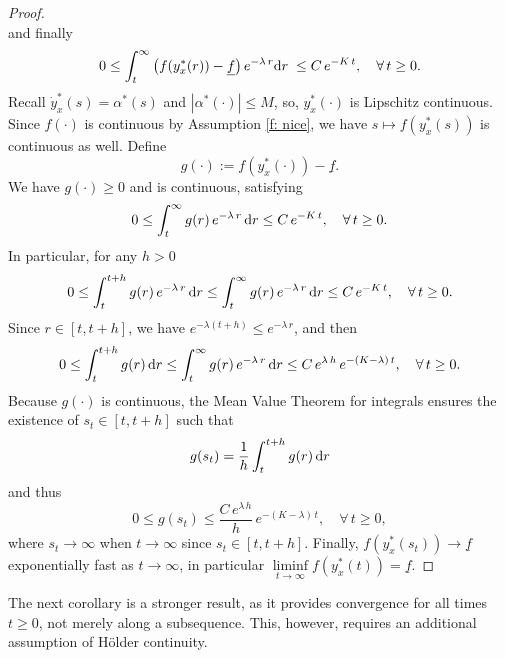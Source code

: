 \documentclass[12pt]{amsart}
\newcommand{\D}[1]{\mbox{\rm #1}}
\newcommand{\dd}{\D{d}}
\numberwithin{equation}{section}
\theoremstyle{plain}
\begin{document}
\begin{proof}
\begin{equation}
\end{equation}
and finally 
\begin{equation*}
    0\leq \int_{t}^{\infty}\left( f(y_{x}^{*}(r)) - \underline{f}\right) e^{-\lambda \, r }\dd r \; \leq C\, e^{-K\,t}, \quad \forall\,t\geq 0.
\end{equation*}
Recall $\dot{y}_{x}^{*}(s) = \alpha^{*}(s)$ and $|\alpha^{*}(\cdot)|\leq M$, so, $y_{x}^{*}(\cdot)$ is Lipschitz continuous. Since $f(\cdot)$ is continuous by Assumption \ref{f: nice}, we have $s\mapsto f(y_{x}^{*}(s))$ is continuous as well. Define
\begin{equation*}
    g(\cdot):= f(y_{x}^{*}(\cdot)) - \underline{f}.
\end{equation*}
We have $g(\cdot)\geq 0$ and is continuous, satisfying 
\begin{equation*}
    0\leq \int_{t}^{\infty} g(r)\,e^{-\lambda \,r}\,\dd r \leq C\, e^{-K\,t}, \quad \forall\,t\geq 0.
\end{equation*}
In particular, for any $h>0$
\begin{equation*}
    0\leq \int_{t}^{t+h} g(r)\,e^{-\lambda \,r}\,\dd r \leq \int_{t}^{\infty} g(r)\,e^{-\lambda \,r}\,\dd r \leq C\, e^{-K\,t}, \quad \forall\,t\geq 0.
\end{equation*}
Since $r\in [t,t+h]$, we have $e^{-\lambda (t+h)} \leq e^{-\lambda\,r}$, and then
\begin{equation*}
    0\leq \int_{t}^{t+h} g(r)\,\dd r \leq \int_{t}^{\infty} g(r)\,e^{-\lambda \,r}\,\dd r \leq C\,e^{\lambda\,h}\, e^{-(K-\lambda)\,t}, \quad \forall\,t\geq 0.
\end{equation*}
Because $g(\cdot)$ is continuous, the Mean Value Theorem for integrals ensures the existence of $s_t \in [t,t+h]$ such that
\begin{equation*}
    g(s_t) = \frac{1}{h}\int_{t}^{t+h} g(r)\,\dd r
\end{equation*}
and thus
\begin{equation*}
    0\leq g(s_t)  \leq \frac{C\,e^{\lambda\,h}}{h}\, e^{-(K-\lambda)\,t}, \quad \forall\,t\geq 0,
\end{equation*}
where $s_t\to \infty$ when $t\to \infty$ since $s_t\in [t,t+h]$. 
Finally, $f(y_{x}^{*}(s_t))\to \underline{f}$ exponentially fast  as $t\to\infty$, in particular $\liminf\limits_{t\to \infty} f(y_{x}^{*}(t)) = \underline{f}$. 
\end{proof}

The next corollary is a stronger result, as it provides convergence for all times $t\geq0$, not merely along a subsequence. 
This, however, requires an additional assumption of H\"older continuity. 
\end{document}
